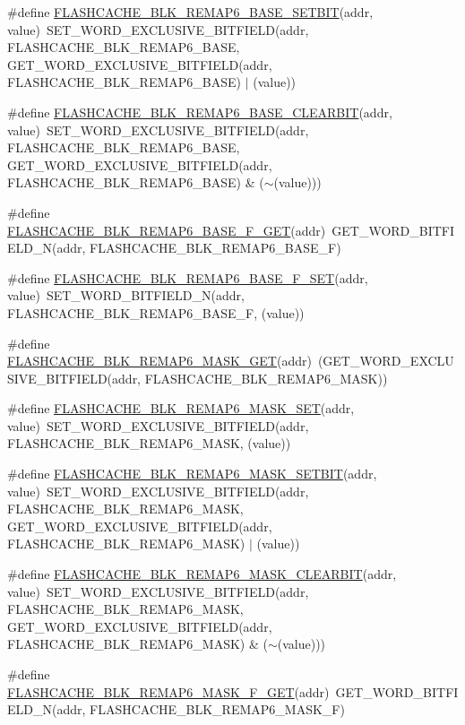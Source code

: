 \begin{DoxyCompactItemize}
\item 
\#define \hyperlink{a00549_a2b2778f25c0cdcb7f8f7ab41a66560bd}{FLASHCACHE\_\-BLK\_\-REMAP6\_\-BASE\_\-SETBIT}(addr, value)~SET\_\-WORD\_\-EXCLUSIVE\_\-BITFIELD(addr, FLASHCACHE\_\-BLK\_\-REMAP6\_\-BASE, GET\_\-WORD\_\-EXCLUSIVE\_\-BITFIELD(addr, FLASHCACHE\_\-BLK\_\-REMAP6\_\-BASE) $|$ (value))
\item 
\#define \hyperlink{a00549_ad030ccb96e8e34f047e3f4963c3afe33}{FLASHCACHE\_\-BLK\_\-REMAP6\_\-BASE\_\-CLEARBIT}(addr, value)~SET\_\-WORD\_\-EXCLUSIVE\_\-BITFIELD(addr, FLASHCACHE\_\-BLK\_\-REMAP6\_\-BASE, GET\_\-WORD\_\-EXCLUSIVE\_\-BITFIELD(addr, FLASHCACHE\_\-BLK\_\-REMAP6\_\-BASE) \& ($\sim$(value)))
\item 
\#define \hyperlink{a00549_a107f2d9a78fe18de70b6f0508c0be679}{FLASHCACHE\_\-BLK\_\-REMAP6\_\-BASE\_\-F\_\-GET}(addr)~GET\_\-WORD\_\-BITFIELD\_\-N(addr, FLASHCACHE\_\-BLK\_\-REMAP6\_\-BASE\_\-F)
\item 
\#define \hyperlink{a00549_abc4b87ebec001a8515f04c660fdd3c1b}{FLASHCACHE\_\-BLK\_\-REMAP6\_\-BASE\_\-F\_\-SET}(addr, value)~SET\_\-WORD\_\-BITFIELD\_\-N(addr, FLASHCACHE\_\-BLK\_\-REMAP6\_\-BASE\_\-F, (value))
\item 
\#define \hyperlink{a00549_a93eea2656214a7a5b1e3bd512d25bb98}{FLASHCACHE\_\-BLK\_\-REMAP6\_\-MASK\_\-GET}(addr)~(GET\_\-WORD\_\-EXCLUSIVE\_\-BITFIELD(addr, FLASHCACHE\_\-BLK\_\-REMAP6\_\-MASK))
\item 
\#define \hyperlink{a00549_a52156a38d299f77a8af69b72244d4151}{FLASHCACHE\_\-BLK\_\-REMAP6\_\-MASK\_\-SET}(addr, value)~SET\_\-WORD\_\-EXCLUSIVE\_\-BITFIELD(addr, FLASHCACHE\_\-BLK\_\-REMAP6\_\-MASK, (value))
\item 
\#define \hyperlink{a00549_a66f98ed674adc7d6460cd2fc5a235993}{FLASHCACHE\_\-BLK\_\-REMAP6\_\-MASK\_\-SETBIT}(addr, value)~SET\_\-WORD\_\-EXCLUSIVE\_\-BITFIELD(addr, FLASHCACHE\_\-BLK\_\-REMAP6\_\-MASK, GET\_\-WORD\_\-EXCLUSIVE\_\-BITFIELD(addr, FLASHCACHE\_\-BLK\_\-REMAP6\_\-MASK) $|$ (value))
\item 
\#define \hyperlink{a00549_a61ffa2a3c20d7e2805a85f52b935426d}{FLASHCACHE\_\-BLK\_\-REMAP6\_\-MASK\_\-CLEARBIT}(addr, value)~SET\_\-WORD\_\-EXCLUSIVE\_\-BITFIELD(addr, FLASHCACHE\_\-BLK\_\-REMAP6\_\-MASK, GET\_\-WORD\_\-EXCLUSIVE\_\-BITFIELD(addr, FLASHCACHE\_\-BLK\_\-REMAP6\_\-MASK) \& ($\sim$(value)))
\item 
\#define \hyperlink{a00549_a20dcbd46efa90ba0ee81c29123f865ab}{FLASHCACHE\_\-BLK\_\-REMAP6\_\-MASK\_\-F\_\-GET}(addr)~GET\_\-WORD\_\-BITFIELD\_\-N(addr, FLASHCACHE\_\-BLK\_\-REMAP6\_\-MASK\_\-F)

\end{DoxyCompactItemize}
